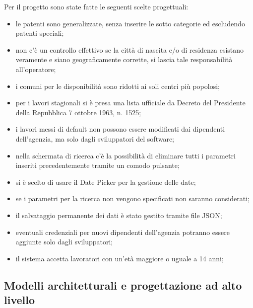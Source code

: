 \documentclass{article}
\begin{document}
    Per il progetto sono state fatte le seguenti scelte progettuali:
    \begin{itemize}
        \item le patenti sono generalizzate, senza inserire le sotto categorie ed escludendo patenti speciali;
        \item non c'è un controllo effettivo se la città di nascita e/o di residenza esistano veramente e siano geograficamente corrette, si lascia tale responsabilità all'operatore;
        \item i comuni per le disponibilità sono ridotti ai soli centri più popolosi;
        \item per i lavori stagionali si è presa una lista ufficiale da Decreto del Presidente della Repubblica 7 ottobre 1963, n. 1525;
        \item i lavori messi di default non possono essere modificati dai dipendenti dell'agenzia, ma solo dagli sviluppatori del software;
        \item nella schermata di ricerca c'è la possibilità di eliminare tutti i parametri inseriti precedentemente tramite un comodo pulsante;
        \item si è scelto di usare il Date Picker per la gestione delle date;
        \item se i parametri per la ricerca non vengono specificati non saranno considerati;
        \item il salvataggio permanente dei dati è stato gestito tramite file JSON;
        \item eventuali credenziali per nuovi dipendenti dell'agenzia potranno essere aggiunte solo dagli sviluppatori;
        \item il sistema accetta lavoratori con un'età maggiore o uguale a 14 anni;
    \end{itemize}

    \subsection{Modelli architetturali e progettazione ad alto livello}
\end{document}
